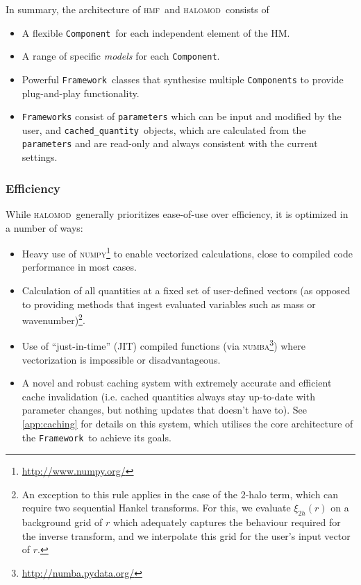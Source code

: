 \documentclass[5p,aas_macros]{elsarticle}
\newcommand{\halomod}{\textsc{halomod}}
\newcommand{\hmf}{\textsc{hmf}}
\newcommand{\framework}{\texttt{Framework}}
\newcommand{\component}{\texttt{Component}}
\newcommand{\cached}{\texttt{cached\_quantity}}
\begin{document}
In summary, the architecture of \hmf\ and \halomod\ consists of
\begin{itemize}
    \item A flexible \component\ for each independent element of the HM.
    \item A range of specific \textit{models} for each \component.
    \item Powerful \framework\ classes that synthesise multiple \verb|Components| to provide plug-and-play functionality.
    \item \texttt{Frameworks} consist of \texttt{parameters} which can be input and modified by the user, and \cached\ objects, which are calculated from the \verb|parameters| and are read-only and always consistent with the current settings.
\end{itemize}



\subsubsection{Efficiency}
\label{sec:halomod:overview:efficiency}

While \halomod\ generally prioritizes ease-of-use over efficiency, it is optimized in a number of ways:
\begin{itemize}
    \item Heavy use of \textsc{numpy}\footnote{\url{http://www.numpy.org/}} to enable vectorized calculations, close to compiled code performance in most cases.
    \item Calculation of all quantities at a fixed set of user-defined vectors (as opposed to providing methods that ingest evaluated variables such as mass or wavenumber)\footnote{An exception to this rule applies in the case of the 2-halo term, which can require two sequential Hankel transforms. For this, we evaluate $\xi_{2h}(r)$ on a background grid of $r$ which adequately captures the behaviour required for the inverse transform, and we interpolate this grid for the user's input vector of $r$.}.
    \item Use of ``just-in-time'' (JIT) compiled functions (via \textsc{numba}\footnote{\url{http://numba.pydata.org/}}) where vectorization is impossible or disadvantageous.
    \item A novel and robust caching system with extremely accurate and efficient cache invalidation (i.e. cached quantities always stay up-to-date with parameter changes, but nothing updates that doesn't have to). See \ref{app:caching} for details on this system, which utilises the core architecture of the \framework\ to achieve its goals.
\end{itemize}
\end{document}
